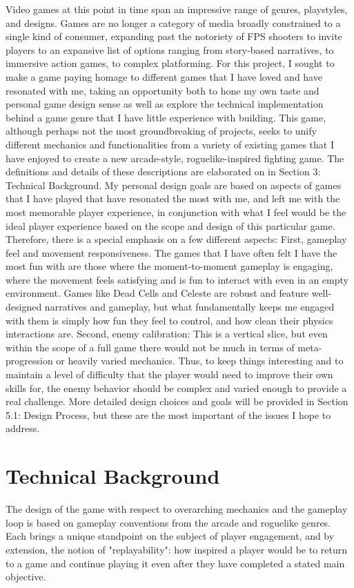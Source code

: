 \documentclass[10pt,twocolumn]{article}
\begin{document}
Video games at this point in time span an impressive range of genres, playstyles, and designs. Games are no longer a category of media broadly constrained to a single kind of consumer, expanding past the notoriety of FPS shooters to invite players to an expansive list of options ranging from story-based narratives, to immersive action games, to complex platforming. For this project, I sought to make a game paying homage to different games that I have loved and have resonated with me, taking an opportunity both to hone my own taste and personal game design sense as well as explore the technical implementation behind a game genre that I have little experience with building.
This game, although perhaps not the most groundbreaking of projects, seeks to unify different mechanics and functionalities from a variety of existing games that I have enjoyed to create a new arcade-style, roguelike-inspired fighting game. The definitions and details of these descriptions are elaborated on in Section 3: Technical Background. My personal design goals are based on aspects of games that I have played that have resonated the most with me, and left me with the most memorable player experience, in conjunction with what I feel would be the ideal player experience based on the scope and design of this particular game. Therefore, there is a special emphasis on a few different aspects:
First, gameplay feel and movement responsiveness. The games that I have often felt I have the most fun with are those where the moment-to-moment gameplay is engaging, where the movement feels satisfying and is fun to interact with even in an empty environment. Games like Dead Cells and Celeste \cite{deadcells} \cite {celeste} are robust and feature well-designed narratives and gameplay, but what fundamentally keeps me engaged with them is simply how fun they feel to control, and how clean their physics interactions are. Second, enemy calibration: This is a vertical slice, but even within the scope of a full game there would not be much in terms of meta-progression or heavily varied mechanics. Thus, to keep things interesting and to maintain a level of difficulty that the player would need to improve their own skills for, the enemy behavior should be complex and varied enough to provide a real challenge. More detailed design choices and goals will be provided in Section 5.1: Design Process, but these are the most important of the issues I hope to address.

\section{Technical Background}
The design of the game with respect to overarching mechanics and the gameplay loop is based on gameplay conventions from the arcade and roguelike genres. Each brings a unique standpoint on the subject of player engagement, and by extension, the notion of "replayability": how inspired a player would be to return to a game and continue playing it even after they have completed a stated main objective.
\end{document}

